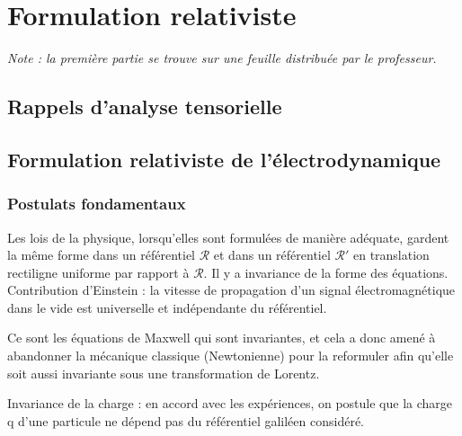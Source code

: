 \chapter{Formulation relativiste}


{\small \it Note : la première partie se trouve sur une feuille distribuée par le professeur.}
\section{Rappels d'analyse tensorielle}
\section{Formulation relativiste de l'électrodynamique}
\subsection{Postulats fondamentaux}

\begin{postulat}
	Les lois de la physique, lorsqu'elles sont formulées de manière adéquate, gardent la m\^eme forme dans un référentiel $\mathcal{R}$ et dans un référentiel $\mathcal{R}'$ en translation rectiligne uniforme par rapport à $\mathcal{R}$. Il y a invariance de la forme des équations.\\
	Contribution d'Einstein : la vitesse de propagation d'un signal électromagnétique dans le vide est universelle et indépendante du référentiel.
\end{postulat}

\begin{cons}
	Ce sont les équations de Maxwell qui sont invariantes, et cela a donc amené à abandonner la mécanique classique (Newtonienne) pour la reformuler afin qu'elle soit aussi invariante sous une transformation de Lorentz.
\end{cons}

\begin{postulat}
	Invariance de la charge : en accord avec les expériences, on postule que la charge q d'une particule ne dépend pas du référentiel galiléen considéré.
\end{postulat}

